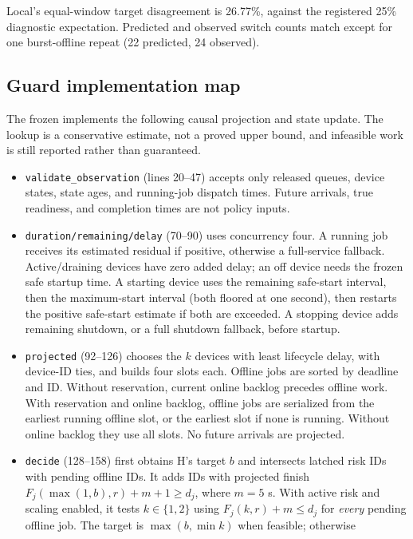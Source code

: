 

Local's equal-window target disagreement is 26.77\%, against the registered
25\% diagnostic expectation. Predicted and observed switch counts match
except for one burst-offline repeat (22 predicted, 24 observed).

\subsection{Guard implementation map}
The frozen  implements the following
causal projection and state update. The lookup is a conservative estimate, not a
proved upper bound, and infeasible work is still reported rather than guaranteed.
\begin{itemize}[leftmargin=*]
\item \texttt{validate\_observation} (lines 20--47) accepts only released queues,
device states, state ages, and running-job dispatch times. Future arrivals,
true readiness, and completion times are not policy inputs.
\item \texttt{duration/remaining/delay} (70--90) uses concurrency four. A running
job receives its estimated residual if positive, otherwise a full-service
fallback. Active/draining devices have zero added delay; an off device needs
the frozen safe startup time. A starting device uses the remaining safe-start
interval, then the maximum-start interval (both floored at one second), then
restarts the positive safe-start estimate if both are exceeded. A stopping
device adds remaining shutdown, or a full shutdown fallback, before startup.
\item \texttt{projected} (92--126) chooses the $k$ devices with least lifecycle
delay, with device-ID ties, and builds four slots each. Offline jobs are sorted
by deadline and ID. Without reservation, current online backlog precedes offline
work. With reservation and online backlog, offline jobs are serialized from the
earliest running offline slot, or the earliest slot if none is running. Without
online backlog they use all slots. No future arrivals are projected.
\item \texttt{decide} (128--158) first obtains H's target $b$ and intersects
latched risk IDs with pending offline IDs. It adds IDs with projected finish
$F_j(\max(1,b),r)+m+1\geq d_j$, where $m=5$ s. With active risk and scaling
enabled, it tests $k\in\{1,2\}$ using $F_j(k,r)+m\leq d_j$ for \emph{every}
pending offline job. The target is $\max(b,\min k)$ when feasible; otherwise

\end{itemize}
